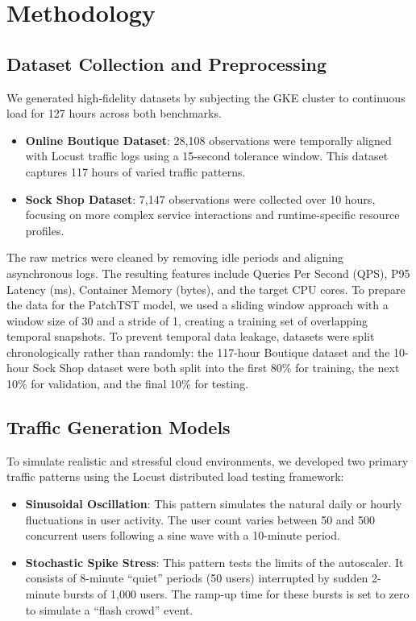 \documentclass[conference]{IEEEtran}
\begin{document}
\section{Methodology}\label{sec:methodology}

\subsection{Dataset Collection and Preprocessing}
We generated high-fidelity datasets by subjecting the GKE cluster to continuous load for 127 hours across both benchmarks. 

\begin{itemize}
    \item \textbf{Online Boutique Dataset}: 28,108 observations were temporally aligned with Locust traffic logs using a 15-second tolerance window. This dataset captures 117 hours of varied traffic patterns.
    \item \textbf{Sock Shop Dataset}: 7,147 observations were collected over 10 hours, focusing on more complex service interactions and runtime-specific resource profiles.
\end{itemize}

The raw metrics were cleaned by removing idle periods and aligning asynchronous logs. The resulting features include Queries Per Second (QPS), P95 Latency (ms), Container Memory (bytes), and the target CPU cores. To prepare the data for the PatchTST model, we used a sliding window approach with a window size of 30 and a stride of 1, creating a training set of overlapping temporal snapshots. To prevent temporal data leakage, datasets were split chronologically rather than randomly: the 117-hour Boutique dataset and the 10-hour Sock Shop dataset were both split into the first 80\% for training, the next 10\% for validation, and the final 10\% for testing.

\subsection{Traffic Generation Models}
To simulate realistic and stressful cloud environments, we developed two primary traffic patterns using the Locust distributed load testing framework:

\begin{itemize}
    \item \textbf{Sinusoidal Oscillation}: This pattern simulates the natural daily or hourly fluctuations in user activity. The user count varies between 50 and 500 concurrent users following a sine wave with a 10-minute period.
    \item \textbf{Stochastic Spike Stress}: This pattern tests the limits of the autoscaler. It consists of 8-minute ``quiet'' periods (50 users) interrupted by sudden 2-minute bursts of 1,000 users. The ramp-up time for these bursts is set to zero to simulate a ``flash crowd'' event.
\end{itemize}
\end{document}
